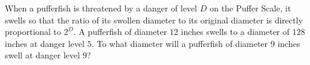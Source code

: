 When a pufferfish is threatened by a danger of level $D$ on the Puffer Scale, it swells so that the ratio of its swollen diameter to its original diameter is directly proportional to $2^D$. A pufferfish of diameter $12$ inches swells to a diameter of $128$ inches at danger level $5$. To what diameter will a pufferfish of diameter $9$ inches swell at danger level $9$?
